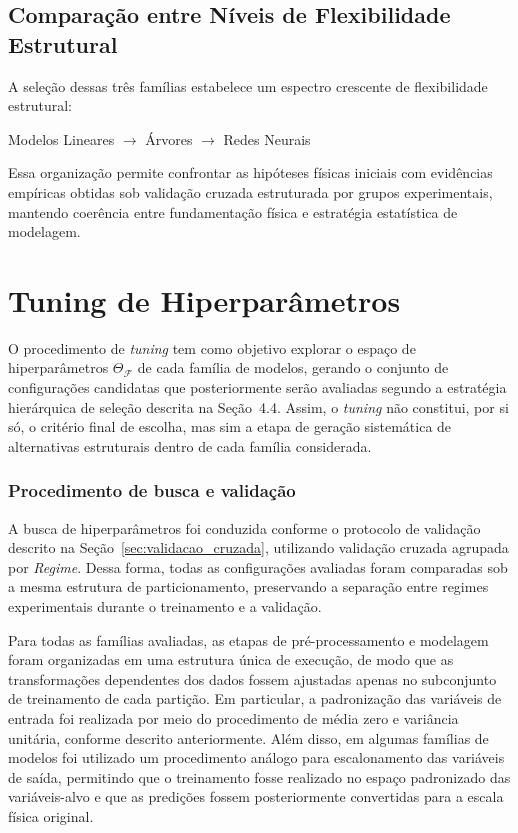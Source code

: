 \subsection{Comparação entre Níveis de Flexibilidade Estrutural}

A seleção dessas três famílias estabelece um espectro crescente de flexibilidade estrutural:

\begin{center}
Modelos Lineares $\rightarrow$ Árvores $\rightarrow$ Redes Neurais
\end{center}

Essa organização permite confrontar as hipóteses físicas iniciais com evidências empíricas obtidas sob validação cruzada estruturada por grupos experimentais, mantendo coerência entre fundamentação física e estratégia estatística de modelagem.
\section{Tuning de Hiperparâmetros}
\label{sec:tuning}

O procedimento de \textit{tuning} tem como objetivo explorar o espaço de hiperparâmetros $\Theta_{\mathcal{F}}$ de cada família de modelos, gerando o conjunto de configurações candidatas que posteriormente serão avaliadas segundo a estratégia hierárquica de seleção descrita na Seção~4.4. Assim, o \textit{tuning} não constitui, por si só, o critério final de escolha, mas sim a etapa de geração sistemática de alternativas estruturais dentro de cada família considerada.

\subsubsection{Procedimento de busca e validação}

A busca de hiperparâmetros foi conduzida conforme o protocolo de validação descrito na Seção~\ref{sec:validacao_cruzada}, utilizando validação cruzada agrupada por \textit{Regime}. Dessa forma, todas as configurações avaliadas foram comparadas sob a mesma estrutura de particionamento, preservando a separação entre regimes experimentais durante o treinamento e a validação.

Para todas as famílias avaliadas, as etapas de pré-processamento e modelagem foram organizadas em uma estrutura única de execução, de modo que as transformações dependentes dos dados fossem ajustadas apenas no subconjunto de treinamento de cada partição. Em particular, a padronização das variáveis de entrada foi realizada por meio do procedimento de média zero e variância unitária, conforme descrito anteriormente. Além disso, em algumas famílias de modelos foi utilizado um procedimento análogo para escalonamento das variáveis de saída, permitindo que o treinamento fosse realizado no espaço padronizado das variáveis-alvo e que as predições fossem posteriormente convertidas para a escala física original.

